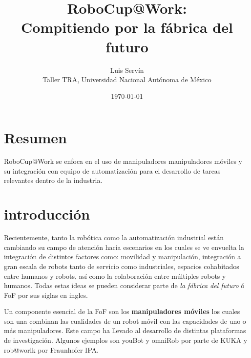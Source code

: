 \documentclass[12pt]{article}
\title{\vspace{-2ex}RoboCup@Work:\\Compitiendo por la fábrica del futuro\vspace{-2ex}}
\date{\today}
\author{Luis Servín\\ Taller TRA, Universidad Nacional Autónoma de México}
\begin{document}
\maketitle

\section*{Resumen}

RoboCup@Work se enfoca en el uso de manipuladores manipuladores móviles y su integración con equipo de automatización para el desarrollo de tareas relevantes dentro de la industria.

\section{introducción}

Recientemente, tanto la robótica como la automatización industrial están cambiando su campo de atención hacia escenarios en los cuales se ve envuelta la integración de distintos factores como: movilidad y manipulación, integración a gran escala de robots tanto de servicio como industriales, espacios cohabitados entre humanos y robots, así como la colaboración entre múltiples robots y humanos. Todas estas ideas se pueden considerar parte de \emph{la fábrica del futuro} ó FoF por sus siglas en ingles.

Un componente esencial de la FoF son los \textbf{manipuladores móviles} los cuales son una combinan las cualidades de un robot móvil con las capacidades de uno o más manipuladores. Este campo ha llevado al desarrollo de distintas plataformas de investigación. Algunos ejemplos son youBot \cite{bischoff2011kuka} y omniRob por parte de KUKA y rob@worlk por  Fraunhofer IPA.



\end{document}
